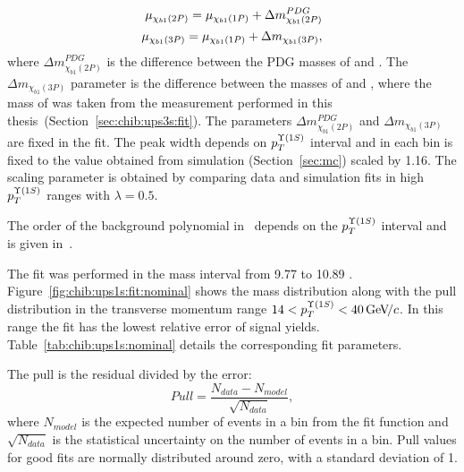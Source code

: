 \begin{equation}
  \begin{aligned}
\mu_{\chi_{b 1}(2P)} = \mu_{\chi_{b 1}(1P)} + \Delta m_{\chi_{b1}(2P)}^{PDG} \\
\mu_{\chi_{b 1}(3P)} = \mu_{\chi_{b 1}(1P)} + \Delta m_{\chi_{b1}(3P)}, \\
  \end{aligned}
\end{equation}
\noindent where $\Delta m_{\chi_{b1}(2P)}^{PDG}$ is the difference between the PDG masses of
\chiboneTwoP and \chiboneOneP. The $\Delta  m_{\chi_{b1}(3P)}$ parameter is the difference
between the masses of \chiboneThreeP and \chiboneOneP, where the mass of
\chiboneThreeP was taken from the measurement performed in this 
thesis~(Section~\ref{sec:chib:ups3s:fit}). The parameters  $\Delta
m_{\chi_{b1}(2P)}^{PDG}$ and $\Delta  m_{\chi_{b1}(3P)}$ are fixed in the fit.
The  \chiboneOneP peak width depends on $p_T^{\Y1S}$ interval and in each bin is fixed to
the value obtained from simulation (Section~\ref{sec:mc}) scaled by 1.16. 
The scaling parameter is obtained by comparing data and simulation fits
in high $p_T^{\Y1S}$ ranges with $\lambda=0.5$.

The order of the background polynomial in~ depends on the
$p_{T}^{\OneS}$ interval and is given in~.



The fit was performed in the mass interval from  9.77 \gevcc to 10.89 \gevcc.
Figure~\ref{fig:chib:ups1s:fit:nominal} shows the mass distribution along with
the pull distribution in the transverse momentum range $14 < p_T^{\OneS} < 40
\gevc$. In this range the fit has the lowest relative error of signal yields. 
Table~\ref{tab:chib:ups1s:nominal} details the corresponding fit parameters.

The pull is the residual divided by the error:
\begin{equation}
\label{eq:pull}
Pull = \frac{N_{data} - N_{model}}{\sqrt{N_{data}}},
\end{equation}
\noindent where $N_{model}$ is the expected number of events in a bin from
the fit function and $\sqrt{N_{data}}$ is the statistical uncertainty on the
number of events in a bin. Pull values  for good fits are normally
distributed around zero, with a standard deviation of 1. 





